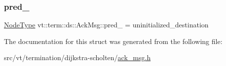 \mbox{\label{structvt_1_1term_1_1ds_1_1_ack_msg_a5371aca85f6cc60da48b9a9314fa02ca}} 
\subsubsection{\texorpdfstring{pred\+\_\+}{pred\_}}
{\footnotesize\ttfamily \hyperlink{namespacevt_a866da9d0efc19c0a1ce79e9e492f47e2}{Node\+Type} vt\+::term\+::ds\+::\+Ack\+Msg\+::pred\+\_\+ = uninitialized\+\_\+destination\hspace{0.3cm}{\ttfamily [private]}}



The documentation for this struct was generated from the following file\+:\begin{DoxyCompactItemize}
\item 
src/vt/termination/dijkstra-\/scholten/\hyperlink{ack__msg_8h}{ack\+\_\+msg.\+h}\end{DoxyCompactItemize}
